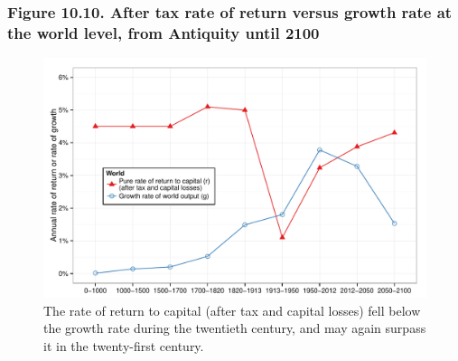 \documentclass[t]{beamer}\usepackage[]{graphicx}\usepackage[]{color}
\newenvironment{knitrout}{}{} %
\begin{document}
\begin{frame}[label=Figure_10_10]
\frametitle{Figure 10.10. After tax rate of return versus growth rate at the world level, from Antiquity until 2100}
\begin{figure}[t]
\begin{minipage}[b]{\textwidth}
\centering
\begin{knitrout}\footnotesize
{}\color{fgcolor}

{\centering \includegraphics[width=1\linewidth]{figures/color/Figure_10_10} 

}



\end{knitrout}
\caption{The rate of return to capital (after tax and capital losses) fell below the growth rate during the twentieth century, and may again surpass it in the twenty-first century.}
\end{minipage}
\end{figure}
\end{frame}
\end{document}
